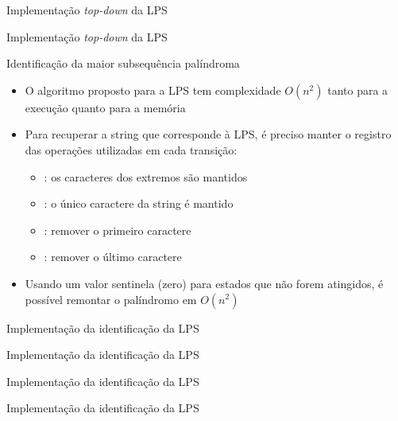 \begin{frame}[fragile]{Implementação {\it top-down} da LPS}
\end{frame}

\begin{frame}[fragile]{Implementação {\it top-down} da LPS}
\end{frame}

\begin{frame}[fragile]{Identificação da maior subsequência palíndroma}

    \begin{itemize}
        \item O algoritmo proposto para a LPS tem complexidade $O(n^2)$ tanto para a execução 
            quanto para a memória

        \item Para recuperar a string que corresponde à LPS, é preciso manter o registro das
            operações utilizadas em cada transição:
            \begin{itemize}
                \item {}: os caracteres dos extremos são mantidos
                \item {}: o único caractere da string é mantido
                \item {}: remover o primeiro caractere 
                \item {}: remover o último caractere 
            \end{itemize}

        \item Usando um valor sentinela (zero) para estados que não forem atingidos, é possível
            remontar o palíndromo em $O(n^2)$
    \end{itemize}

\end{frame}

\begin{frame}[fragile]{Implementação da identificação da LPS}
\end{frame}

\begin{frame}[fragile]{Implementação da identificação da LPS}
\end{frame}

\begin{frame}[fragile]{Implementação da identificação da LPS}
\end{frame}

\begin{frame}[fragile]{Implementação da identificação da LPS}
\end{frame}
